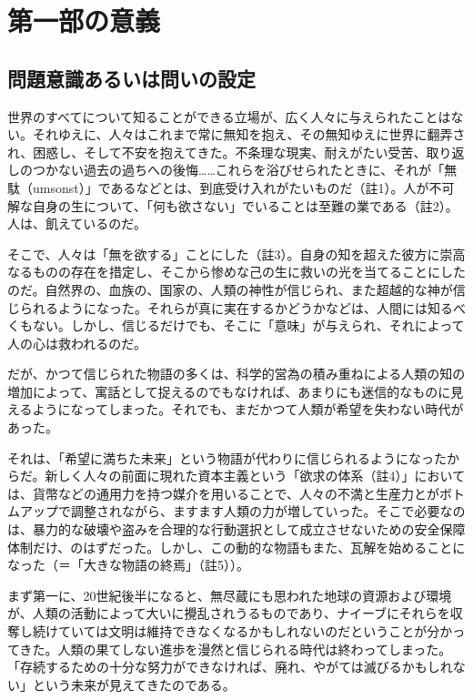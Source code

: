\section{第一部の意義}\label{ux7b2cux4e00ux90e8ux306eux610fux7fa9}

\subsection{問題意識あるいは問いの設定}\label{ux554fux984cux610fux8b58ux3042ux308bux3044ux306fux554fux3044ux306eux8a2dux5b9a}

世界のすべてについて知ることができる立場が、広く人々に与えられたことはない。それゆえに、人々はこれまで常に無知を抱え、その無知ゆえに世界に翻弄され、困惑し、そして不安を抱えてきた。不条理な現実、耐えがたい受苦、取り返しのつかない過去の過ちへの後悔\ldots\ldots これらを浴びせられたときに、それが「無駄（umsonst）」であるなどとは、到底受け入れがたいものだ（註1）。人が不可解な自身の生について、「何も欲さない」でいることは至難の業である（註2）。人は、飢えているのだ。

そこで、人々は「無を欲する」ことにした（註3）。自身の知を超えた彼方に崇高なるものの存在を措定し、そこから惨めな己の生に救いの光を当てることにしたのだ。自然界の、血族の、国家の、人類の神性が信じられ、また超越的な神が信じられるようになった。それらが真に実在するかどうかなどは、人間には知るべくもない。しかし、信じるだけでも、そこに「意味」が与えられ、それによって人の心は救われるのだ。

だが、かつて信じられた物語の多くは、科学的営為の積み重ねによる人類の知の増加によって、寓話として捉えるのでもなければ、あまりにも迷信的なものに見えるようになってしまった。それでも、まだかつて人類が希望を失わない時代があった。

それは、「希望に満ちた未来」という物語が代わりに信じられるようになったからだ。新しく人々の前面に現れた資本主義という「欲求の体系（註4）」においては、貨幣などの通用力を持つ媒介を用いることで、人々の不満と生産力とがボトムアップで調整されながら、ますます人類の力が増していった。そこで必要なのは、暴力的な破壊や盗みを合理的な行動選択として成立させないための安全保障体制だけ、のはずだった。しかし、この動的な物語もまた、瓦解を始めることになった（＝「大きな物語の終焉」（註5））。

まず第一に、20世紀後半になると、無尽蔵にも思われた地球の資源および環境が、人類の活動によって大いに攪乱されうるものであり、ナイーブにそれらを収奪し続けていては文明は維持できなくなるかもしれないのだということが分かってきた。人類の果てしない進歩を漫然と信じられる時代は終わってしまった。「存続するための十分な努力ができなければ、廃れ、やがては滅びるかもしれない」という未来が見えてきたのである。

